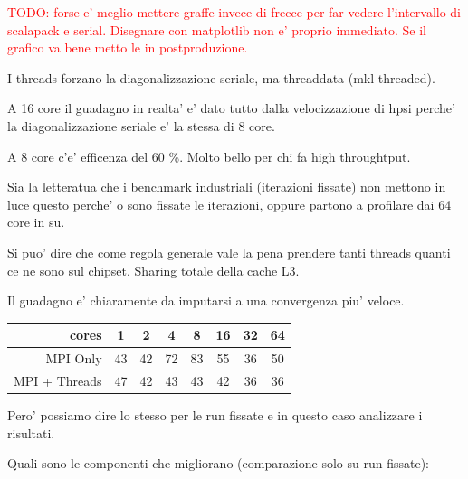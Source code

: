 \documentclass[a4paper,12pt]{article}
\newcommand\mynotes[1]{\begin{flushright}

\textcolor{red}{TODO: #1}\end{flushright}}
\begin{document}
\mynotes{ forse e' meglio mettere graffe invece di frecce per far vedere l'intervallo di scalapack e serial.
Disegnare con matplotlib non e' proprio immediato. Se il grafico va bene metto le in postproduzione.}

I threads forzano la diagonalizzazione seriale, ma threaddata (mkl threaded).

A 16 core il guadagno in realta' e' dato tutto dalla velocizzazione di hpsi perche' la diagonalizzazione seriale e' la stessa di 8 core.

A 8 core c'e' efficenza del 60 \%. Molto bello per chi fa high throughtput.

Sia la letteratua che i benchmark industriali (iterazioni fissate) non mettono in luce questo perche' o sono fissate le iterazioni, oppure partono a profilare dai 64 core in su.

Si puo' dire che come regola generale vale la pena prendere tanti threads quanti ce ne sono sul chipset.
Sharing totale della cache L3.

Il guadagno e' chiaramente da imputarsi a una convergenza piu' veloce.

\begin{center}
\begin{tabular}{r|ccccccc}
\toprule
cores 	 &  1  &  2  &  4  &  8  &  16  &  32  &  64 \\
\midrule
MPI Only & 43  & 42  & 72  & 83  &  55  &  36  &  50 \\ 
MPI + Threads &  47  &  42  &  43  &  43  &  42  &  36  &  36 \\ 
\bottomrule
\end{tabular}
\end{center}



Pero' possiamo dire lo stesso per le run fissate e in questo caso analizzare i risultati.


Quali sono le componenti che migliorano (comparazione solo su run fissate):
\end{document}
